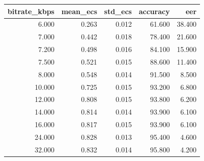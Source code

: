\begin{tabular}{rrrrr}
\toprule
bitrate_kbps & mean_ecs & std_ecs & accuracy & eer \\
\midrule
6.000 & 0.263 & 0.012 & 61.600 & 38.400 \\
7.000 & 0.442 & 0.018 & 78.400 & 21.600 \\
7.200 & 0.498 & 0.016 & 84.100 & 15.900 \\
7.500 & 0.521 & 0.015 & 88.600 & 11.400 \\
8.000 & 0.548 & 0.014 & 91.500 & 8.500 \\
10.000 & 0.725 & 0.015 & 93.200 & 6.800 \\
12.000 & 0.808 & 0.015 & 93.800 & 6.200 \\
14.000 & 0.814 & 0.014 & 93.900 & 6.100 \\
16.000 & 0.817 & 0.015 & 93.900 & 6.100 \\
24.000 & 0.828 & 0.013 & 95.400 & 4.600 \\
32.000 & 0.832 & 0.014 & 95.800 & 4.200 \\
\bottomrule
\end{tabular}
